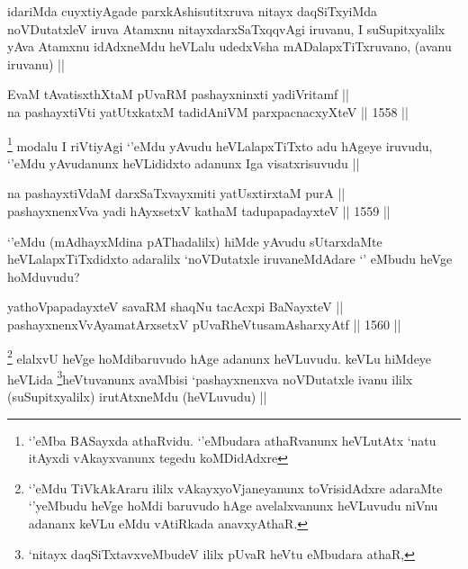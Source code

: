\begin{artha}
idariMda cuyxtiyAgade parxkAshisutitxruva nitayx daqSiTxyiMda noVDutatxleV iruva Atamxnu nitayxdarxSaTxqqvAgi iruvanu, I suSupitxyalilx yAva Atamxnu idAdxneMdu heVLalu udedxVsha mADalapxTiTxruvano, (avanu iruvanu) ||
\end{artha}


\begin{shl}
EvaM tAvatisxthXtaM pUvaRM pashayxninxti yadiVritamf || \\
na pashayxtiVti yatUtxkatxM tadidAniVM parxpacnacxyXteV ||  1558 ||  
\end{shl}

\begin{artha}
\footnote{`\stext'eMba BASayxda athaRvidu. `\stext'eMbudara athaRvanunx heVLutAtx `natu itAyxdi vAkayxvanunx tegedu koMDidAdxre}
modalu I riVtiyAgi `\stext'eMdu yAvudu heVLalapxTiTxto adu hAgeye iruvudu, `\stext'eMdu yAvudanunx heVLididxto adanunx Iga visatxrisuvudu ||
\end{artha}

\begin{shl}
na pashayxtiVdaM darxSaTxvayxmiti yatUsxtirxtaM purA || \\
pashayxnenxVva yadi hAyxsetxV kathaM tadupapadayxteV ||  1559 ||  
\end{shl}

\begin{artha}
`\stext'eMdu (mAdhayxMdina pAThadalilx) hiMde yAvudu sUtarxdaMte heVLalapxTiTxdidxto adaralilx `noVDutatxle iruvaneMdAdare `\stext' eMbudu heVge hoMduvudu?
\end{artha}

\begin{shl}
yathoVpapadayxteV savaRM shaqNu tacAcxpi BaNayxteV || \\
pashayxnenxVvAyamatArx\s \s setxV pUvaRheVtusamAsharxyAtf ||  1560 ||  
\end{shl}

\begin{artha}
\footnote{`\stext'eMdu TiVkAkAraru ililx vAkayxyoVjaneyanunx toVrisidAdxre adaraMte `\stext'yeMbudu heVge hoMdi baruvudo hAge avelalxvanunx heVLuvudu niVnu adananx keVLu eMdu vAtiRkada anavxyAthaR.}
elalxvU heVge hoMdibaruvudo hAge adanunx heVLuvudu. keVLu hiMdeye heVLida \footnote{`nitayx daqSiTxtavxveMbudeV ililx pUvaR heVtu eMbudara athaR,}heVtuvanunx avaMbisi `pashayxnenxva noVDutatxle ivanu ililx (suSupitxyalilx) irutAtxneMdu (heVLuvudu) ||
\end{artha}

